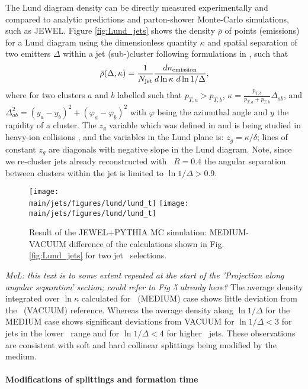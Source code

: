 The Lund diagram density can be directly measured experimentally and compared to analytic predictions and parton-shower Monte-Carlo simulations, such as JEWEL.
Figure \ref{fig:Lund_jets} shows the density $\bar{\rho}$ of points (emissions) for a Lund diagram using the dimensionless quantity $\kappa$ and spatial separation of two emitters $\Delta$ within a jet (sub-)cluster following formulations in \cite{Dreyer:2018nbf}, such that
\begin{equation}
\bar{\rho}(\Delta, \kappa) = \frac{1}{N_{\rm jet}} \frac{dn_{\rm emission}}{d \ln \kappa~d \ln 1/\Delta},
\end{equation}
where for two clusters $a$ and $b$ labelled such that $p_{T,a} > p_{T,b}$, $\kappa=\frac{p_{T,b}}{p_{T,a} + p_{T,b}}\Delta_{ab}$, and $\Delta_{ab}^{2} = (y_a - y_b)^2 + (\varphi_a - \varphi_b)^2$ with $\varphi$ being the azimuthal angle and $y$ the rapidity of a cluster.
The $z_{g}$ variable which was defined in \cite{Larkoski:2017bvj} and is being studied in heavy-ion collisions \cite{Sirunyan:2017bsd}, and the variables in the Lund plane is: $z_{g} = \kappa/\delta$; lines of constant $z_g$ are diagonals with negative slope in the Lund diagram.
Note, since we re-cluster jets already reconstructed with \akt\ $R=0.4$ the angular separation between clusters within the jet is limited to $\ln 1/\Delta > 0.9$.

\begin{figure}[htbp]
	\centering
	\texttt{[image: \\main/jets/figures/lund/lund\_t]}
	\texttt{[image: \\main/jets/figures/lund/lund\_t]}
	\caption{Result of the JEWEL+PYTHIA MC simulation: MEDIUM-VACUUM difference of the calculations shown in Fig. \ref{fig:Lund_jets} for two jet \pt\ selections.}
	\label{fig:Lund_jets_vac_med}
\end{figure}

\textit{MvL: this text is to some extent repeated at the start of the 'Projection along angular separation' section; could refer to Fig 5 already here?}
The average density integrated over $\ln \kappa$ calculated for \PbPb\ (MEDIUM) case shows little deviation from the \pp\ (VACUUM) reference.
Whereas the average density along $\ln 1/\Delta$ for the MEDIUM case shows significant deviations from VACUUM for $\ln 1/\Delta < 3$ for jets in the lower \pt\ range and for $\ln 1/\Delta < 4$ for higher \pt\ jets.
These observations are consistent with soft and hard collinear splittings being modified by the medium.

\paragraph{Modifications of splittings and formation time}


